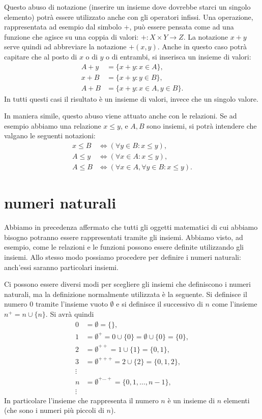 \documentclass[italian,a4paper,hidelinks,headinclude]{scrartcl}
\begin{document}
Questo abuso di notazione
(inserire un insieme dove dovrebbe starci un singolo elemento)
potrà essere utilizzato anche con gli operatori infissi.
Una operazione, rappresentata ad esempio dal simbolo $+$, può essere pensata
come ad una funzione che agisce su una coppia di valori: $+\colon X\times Y \to Z$.
La notazione $x+y$ serve quindi ad abbreviare la notazione $+(x,y)$.
Anche in questo caso potrà capitare che al posto di $x$ o di $y$ o di entrambi,
si inserisca un insieme di valori:
\begin{align*}
   A + y &= \{x+y\colon x \in A\}, \\
   x + B &= \{x+y\colon y \in B\}, \\
   A + B &= \{x+y\colon x\in A, y \in B\}.
\end{align*}
In tutti questi casi il risultato è un insieme di valori, invece che un singolo
valore.

In maniera simile, questo abuso viene attuato anche con le relazioni.
Se ad esempio abbiamo
una relazione $x\le y$, e $A, B$ sono insiemi, si potrà intendere
che valgano le seguenti notazioni:
\begin{align*}
  x \le B &\iff (\forall y\in B\colon x\le y), \\
  A \le y &\iff (\forall x\in A\colon x \le y), \\
  A \le B &\iff (\forall x\in A, \forall y\in B\colon x\le y).
\end{align*}

\section{numeri naturali}

Abbiamo in precedenza affermato che tutti gli oggetti matematici di cui abbiamo
bisogno potranno essere rappresentati tramite gli insiemi.
Abbiamo visto, ad esempio, come le relazioni e le funzioni possono essere definite
utilizzando gli insiemi. Allo stesso modo possiamo procedere per definire i numeri
naturali: anch'essi saranno particolari insiemi.

Ci possono essere diversi modi per scegliere gli insiemi che definiscono i numeri
naturali, ma la definizione normalmente utilizzata è la seguente.
Si definisce il numero $0$ tramite l'insieme vuoto $\emptyset$ e si definisce
il successivo di $n$ come l'insieme $n^+ = n \cup \{ n \}$. Si avrà quindi
\begin{align*}
  0 &= \emptyset = \{\}, \\
  1 &= \emptyset^+ = 0 \cup \{0\} = \emptyset \cup \{0\} = \{0\}, \\
  2 &= \emptyset^{++} = 1 \cup \{1\} = \{0, 1\}, \\
  3 &= \emptyset^{+++} = 2 \cup \{2\} = \{0, 1, 2\},\\
  \vdots \\
  n &= \emptyset^{+\dots +} = \{ 0, 1, \dots, n-1\}, \\
  \vdots
\end{align*}
In particolare l'insieme che rappresenta il numero $n$ è un insieme di $n$
elementi (che sono i numeri più piccoli di $n$).
\end{document}
